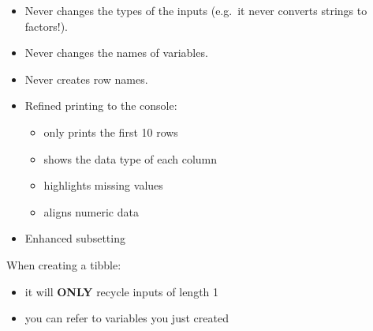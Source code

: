 \documentclass[]{book}
\newenvironment{Shaded}{\begin{snugshade}}{\end{snugshade}}
\newcommand{\KeywordTok}[1]{\textcolor[rgb]{0.13,0.29,0.53}{\textbf{#1}}}
\newcommand{\DataTypeTok}[1]{\textcolor[rgb]{0.13,0.29,0.53}{#1}}
\newcommand{\DecValTok}[1]{\textcolor[rgb]{0.00,0.00,0.81}{#1}}
\newcommand{\StringTok}[1]{\textcolor[rgb]{0.31,0.60,0.02}{#1}}
\newcommand{\CommentTok}[1]{\textcolor[rgb]{0.56,0.35,0.01}{\textit{#1}}}
\newcommand{\OperatorTok}[1]{\textcolor[rgb]{0.81,0.36,0.00}{\textbf{#1}}}
\newcommand{\NormalTok}[1]{#1}
\providecommand{\tightlist}{%
  \setlength{\itemsep}{0pt}\setlength{\parskip}{0pt}}
\theoremstyle{definition}
\theoremstyle{definition}
\theoremstyle{definition}
\theoremstyle{remark}
\begin{document}
\begin{itemize}
\tightlist
\item
  Never changes the types of the inputs (e.g.~it never converts strings
  to factors!).
\item
  Never changes the names of variables.
\item
  Never creates row names.
\item
  Refined printing to the console:

  \begin{itemize}
  \tightlist
  \item
    only prints the first 10 rows
  \item
    shows the data type of each column
  \item
    highlights missing values
  \item
    aligns numeric data
  \end{itemize}
\item
  Enhanced subsetting
\end{itemize}

When creating a tibble:

\begin{itemize}
\tightlist
\item
  it will \textbf{ONLY} recycle inputs of length 1
\item
  you can refer to variables you just created
\end{itemize}

\begin{Shaded}
\end{Shaded}
\end{document}
